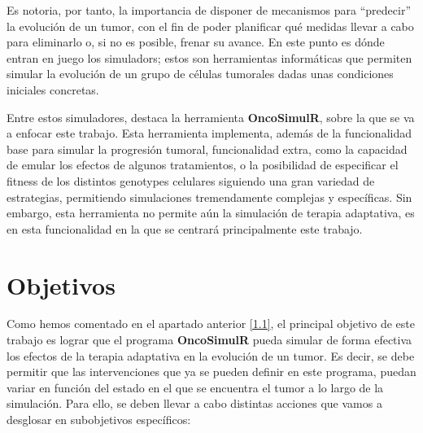 Es notoria, por tanto, la importancia de disponer de mecanismos para ``predecir'' la evolución de un \gls{tumor}, con el fin de poder planificar qué medidas llevar a cabo para eliminarlo o, si no es posible, frenar su avance. En este punto es dónde entran en juego los \glspl{simulador}; estos son herramientas informáticas que permiten simular la evolución de un grupo de células tumorales dadas unas condiciones iniciales concretas.

Entre estos simuladores, destaca la herramienta \textbf{OncoSimulR}\cite{OncoSimulR}, sobre la que se va a enfocar este trabajo. Esta herramienta implementa, además de la funcionalidad base para simular la progresión tumoral, funcionalidad extra, como la capacidad de emular los efectos de algunos tratamientos, o la posibilidad de especificar el \gls{fitness} de los distintos \glspl{genotype} celulares siguiendo una gran variedad de estrategias, permitiendo simulaciones tremendamente complejas y específicas. Sin embargo, esta herramienta no permite aún la simulación de terapia adaptativa, es en esta funcionalidad en la que se centrará principalmente este trabajo.

\section{Objetivos}\label{1.2}

Como hemos comentado en el apartado anterior \ref{1.1}, el principal objetivo de este trabajo es lograr que el programa \textbf{OncoSimulR} pueda simular de forma efectiva los efectos de la terapia adaptativa en la evolución de un \gls{tumor}. Es decir, se debe permitir que las intervenciones que ya se pueden definir en este programa, puedan variar en función del estado en el que se encuentra el \gls{tumor} a lo largo de la simulación. Para ello, se deben llevar a cabo distintas acciones que vamos a desglosar en subobjetivos específicos:

